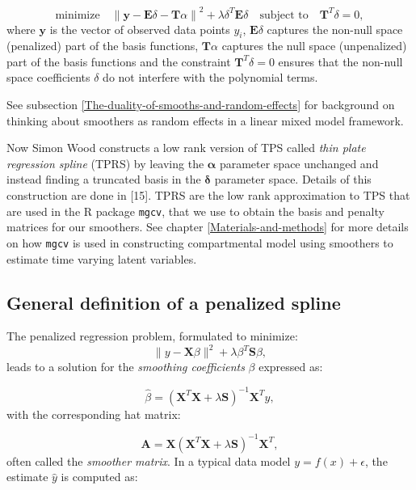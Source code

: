 \documentclass[
11pt, %
oneside, %
english, %
singlespacing, %
]{macthesis} %
\begin{document}
\[
\text{minimize} \quad \left\| \mathbf{y} - \mathbf{E} \delta - \mathbf{T} \alpha \right\|^2 + \lambda \delta^T \mathbf{E} \delta \quad \text{subject to} \quad \mathbf{T}^T \delta = 0,
\]
where \(\mathbf{y}\) is the vector of observed data points \(y_i\), \(\mathbf{E} \delta\) captures the non-null space (penalized) part of the basis functions, \(\mathbf{T} \alpha\) captures the null space (unpenalized) part of the basis functions and the constraint \(\mathbf{T}^T \delta = 0\) ensures that the non-null space coefficients \(\delta\) do not interfere with the polynomial terms.

See subsection \ref{The-duality-of-smooths-and-random-effects} for background on thinking about smoothers as random effects in a linear mixed model framework.

Now Simon Wood constructs a low rank version of TPS called \emph{thin plate regression spline} (TPRS) by leaving the \(\mathbf{\alpha}\) parameter space unchanged and instead finding a truncated basis in the \(\mathbf{\delta}\) parameter space. Details of this construction are done in {[}15{]}. TPRS are the low rank approximation to TPS that are used in the R package \texttt{mgcv}, that we use to obtain the basis and penalty matrices for our smoothers. See chapter \ref{Materials-and-methods} for more details on how \texttt{mgcv} is used in constructing compartmental model using smoothers to estimate time varying latent variables.

\subsection{General definition of a penalized spline}\label{General-definition-of-a-penalized-spline}

The penalized regression problem, formulated to minimize:
\begin{equation}
\|y - \mathbf{X}\beta\|^2 + \lambda \beta^T \mathbf{S} \beta,
\label{eq:penalizedregression}
\end{equation}
leads to a solution for the \emph{smoothing coefficients} \(\beta\) expressed as:

\begin{equation}
\hat{\beta} = (\mathbf{X}^T\mathbf{X}+ \lambda \mathbf{S})^{-1}\mathbf{X}^Ty,
\label{eq:penalizedleastsquaresminimizer}
\end{equation}
with the corresponding hat matrix:

\[
\mathbf{A} = \mathbf{X}(\mathbf{X}^T\mathbf{X}+ \lambda \mathbf{S})^{-1}\mathbf{X}^T,
\]
often called the \emph{smoother matrix}. In a typical data model \(y = f(x) + \epsilon\), the estimate \(\hat{y}\) is computed as:
\end{document}
